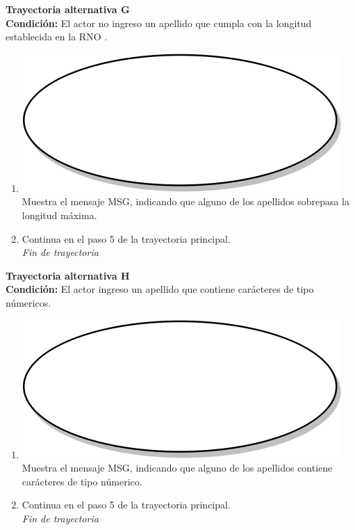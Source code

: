 \textbf{Trayectoria alternativa G} \label{cu2_ta_g}\\
\textbf{Condición:} El actor no ingreso un apellido que cumpla con la longitud establecida en la RNO .\\
 \begin{enumerate}[label=G\arabic*]
    \item {\includegraphics[scale=.05]{Capitulo3/img/proceso.png} Muestra el mensaje MSG, indicando que alguno de los apellidos sobrepasa la longitud máxima.}
    \item {Continua en el paso 5 de la trayectoria principal.} \\
    \textit{Fin de trayectoria} \\
\end{enumerate}

\textbf{Trayectoria alternativa H} \label{cu2_ta_h}\\
\textbf{Condición:} El actor ingreso un apellido que contiene carácteres de tipo númericos.\\
 \begin{enumerate}[label=H\arabic*]
    \item {\includegraphics[scale=.05]{Capitulo3/img/proceso.png} Muestra el mensaje MSG, indicando que alguno de los apellidos contiene carácteres de tipo númerico.}
    \item {Continua en el paso 5 de la trayectoria principal.} \\
    \textit{Fin de trayectoria} \\
\end{enumerate}

